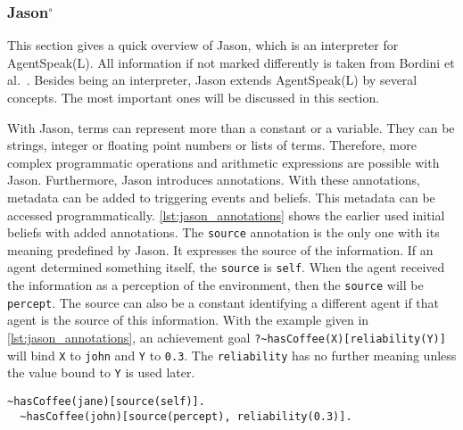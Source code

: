 \subsubsection[Jason]{Jason$^\circ$}\label{fun:apl_jason}
This section gives a quick overview of Jason, which is an interpreter for AgentSpeak(L).
All information if not marked differently is taken from Bordini et al.~\cite{bordini_jason_2005}.
Besides being an interpreter, Jason extends AgentSpeak(L) by several concepts.
The most important ones will be discussed in this section.

With Jason, terms can represent more than a constant or a variable.
They can be strings, integer or floating point numbers or lists of terms.
Therefore, more complex programmatic operations and arithmetic expressions are possible with Jason.
Furthermore, Jason introduces annotations.
With these annotations, metadata can be added to triggering events and beliefs.
This metadata can be accessed programmatically.
\autoref{lst:jason_annotations} shows the earlier used initial beliefs with added annotations.
The \texttt{source} annotation is the only one with its meaning predefined by Jason.
It expresses the source of the information.
If an agent determined something itself, the \texttt{source} is \texttt{self}.
When the agent received the information as a perception of the environment, then the \texttt{source} will be \texttt{percept}.
The source can also be a constant identifying a different agent if that agent is the source of this information.
With the example given in \autoref{lst:jason_annotations}, an achievement goal \texttt{?\~{}hasCoffee(X)[reliability(Y)]} will bind \texttt{X} to \texttt{john} and \texttt{Y} to \texttt{0.3}.
The \texttt{reliability} has no further meaning unless the value bound to \texttt{Y} is used later.
\begin{lstlisting}[caption={Annotation of beliefs in Jason.}, label=lst:jason_annotations]
  ~hasCoffee(jane)[source(self)].
  ~hasCoffee(john)[source(percept), reliability(0.3)].
\end{lstlisting}

